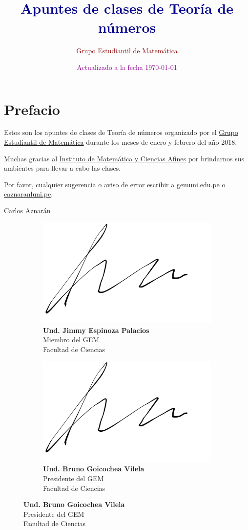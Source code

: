 \documentclass[oneside,a5paper]{memoir}
\title{\Huge\bfseries\textcolor{DarkBlue}{Apuntes de clases de Teoría de números}}
\author{\LARGE\textcolor{DarkRed}{Grupo Estudiantil de Matemática}}
\date{\textcolor{DarkMagenta}{Actualizado a la fecha \today}}
\begin{document}
\maketitle

\chapter*{Prefacio}

Estos son los apuntes de clases de Teoría de números organizado por el \href{https://web.facebook.com/GEMFCUNI/}{Grupo Estudiantil de Matemática} durante los meses de enero y febrero del año 2018.

Muchas gracias al \href{http://imca.edu.pe/portal/index.php/es/}{Instituto de Matemática y Ciencias Afines} por brindarnos sus ambientes para llevar a cabo las clases.

Por favor, cualquier sugerencia o aviso de error escribir a {\href{mailto:gem@uni.edu.pe}{gem\MVAt uni.edu.pe}} o {\href{mailto:caznaranl@uni.pe}{caznaranl\MVAt uni.pe}}.

\begin{flushright}
	Carlos Aznarán
	
\end{flushright}

\begin{figure}[h]
	\begin{subfigure}[b]{.5\textwidth}
		\centering
		\captionsetup{justification=centering,margin=0.5cm}
		\includegraphics[height=4\baselineskip,width=.4\linewidth]{signature.png}
		\caption*{\textbf{Und. Jimmy Espinoza Palacios}\\Miembro del GEM\\Facultad de Ciencias}
	\end{subfigure}
	\begin{subfigure}[b]{.5\textwidth}
		\centering
		\captionsetup{justification=centering,margin=0.5cm}
		\includegraphics[height=4\baselineskip,width=.4\linewidth]{signature.png}
		\caption*{\textbf{Und. Bruno Goicochea Vilela}\\Presidente del GEM\\Facultad de Ciencias}
	\end{subfigure}
\end{figure}%
\end{document}
